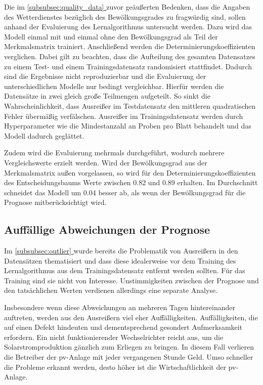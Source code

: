 \documentclass[12pt, a4paper]{article}
\newcommand*{\fullref}[1]{\hyperref[{#1}]{\autoref*{#1} \textit{\nameref*{#1}}}}
\begin{document}
Die im \fullref{subsubsec:quality_data} zuvor geäußerten Bedenken, dass die Angaben des Wetterdienstes bezüglich des Bewölkungsgrades zu fragwürdig sind, sollen anhand der Evaluierung des Lernalgorithmus untersucht werden. Dazu wird das Modell einmal mit und einmal ohne den Bewölkungsgrad als Teil der Merkmalsmatrix trainiert. Anschließend werden die Determinierungskoeffizienten verglichen. Dabei gilt zu beachten, dass die Aufteilung des gesamten Datensatzes zu einem Test- und einem Trainingsdatensatz randomisiert stattfindet. Dadurch sind die Ergebnisse nicht reproduzierbar und die Evaluierung der unterschiedlichen Modelle nur bedingt vergleichbar. Hierfür werden die Datensätze in zwei gleich große Teilmengen aufgeteilt. So sinkt die Wahrscheinlichkeit, dass Ausreißer im Testdatensatz den mittleren quadratischen Fehler übermäßig verfälschen. Ausreißer im Trainingsdatensatz werden durch Hyperparameter wie die Mindestanzahl an Proben pro Blatt behandelt und das Modell dadurch geglättet. 

Zudem wird die Evaluierung mehrmals durchgeführt, wodurch mehrere Vergleichswerte erzielt werden. Wird der Bewölkungsgrad aus der Merkmalsmatrix außen vorgelassen, so wird für den Determinierungskoeffizienten des Entscheidungsbaums Werte zwischen 0.82 und 0.89 erhalten. Im Durchschnitt schneidet das Modell um 0.04 besser ab, als wenn der Bewölkungsgrad für die Prognose mitberücksichtigt wird. 

\subsection{Auffällige Abweichungen der Prognose}

Im \fullref{subsubsec:outlier} wurde bereits die Problematik von Ausreißern in den Datensätzen thematisiert und dass diese idealerweise vor dem Training des Lernalgorithmus aus dem Trainingsdatensatz entfernt werden sollten. Für das Training sind sie nicht von Interesse. Unstimmigkeiten zwischen der Prognose und den tatsächlichen Werten verdienen allerdings eine separate Analyse.

Insbesondere wenn diese Abweichungen an mehreren Tagen hintereinander auftreten, werden aus den Ausreißern viel eher Auffälligkeiten. Auffälligkeiten, die auf einen Defekt hindeuten und dementsprechend gesondert Aufmerksamkeit erfordern. Ein nicht funktionierender Wechselrichter reicht aus, um die Solarstromproduktion gänzlich zum Erliegen zu bringen. In diesem Fall verlieren die Betreiber der \ac{pv}-Anlage mit jeder vergangenen Stunde Geld. Umso schneller die Probleme erkannt werden, desto höher ist die Wirtschaftlichkeit der \ac{pv}-Anlage.
\end{document}
